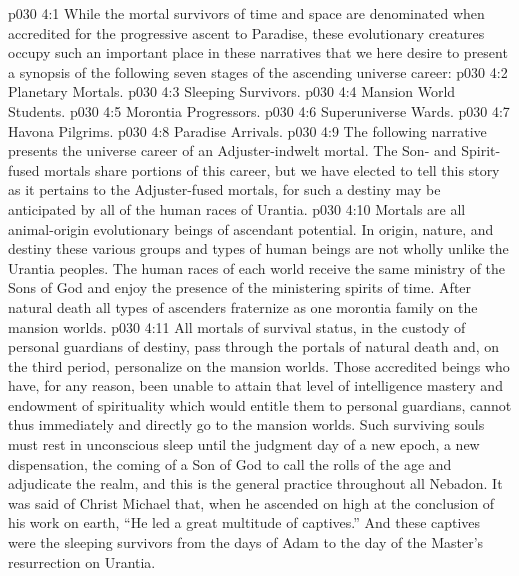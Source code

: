 \vs p030 4:1 While the mortal survivors of time and space are denominated  when accredited for the progressive ascent to Paradise, these evolutionary creatures occupy such an important place in these narratives that we here desire to present a synopsis of the following seven stages of the ascending universe career:
\vs p030 4:2 \bibnobreakspace Planetary Mortals.
\vs p030 4:3 \bibnobreakspace Sleeping Survivors.
\vs p030 4:4 \bibnobreakspace Mansion World Students.
\vs p030 4:5 \bibnobreakspace Morontia Progressors.
\vs p030 4:6 \bibnobreakspace Superuniverse Wards.
\vs p030 4:7 \bibnobreakspace Havona Pilgrims.
\vs p030 4:8 \bibnobreakspace Paradise Arrivals.
\vs p030 4:9 \pc The following narrative presents the universe career of an Adjuster\hyp{}indwelt mortal. The Son\hyp{} and Spirit\hyp{}fused mortals share portions of this career, but we have elected to tell this story as it pertains to the Adjuster\hyp{}fused mortals, for such a destiny may be anticipated by all of the human races of Urantia.
\vs p030 4:10 \bibnobreakspace {} Mortals are all animal\hyp{}origin evolutionary beings of ascendant potential. In origin, nature, and destiny these various groups and types of human beings are not wholly unlike the Urantia peoples. The human races of each world receive the same ministry of the Sons of God and enjoy the presence of the ministering spirits of time. After natural death all types of ascenders fraternize as one morontia family on the mansion worlds.
\vs p030 4:11 \bibnobreakspace {} All mortals of survival status, in the custody of personal guardians of destiny, pass through the portals of natural death and, on the third period, personalize on the mansion worlds. Those accredited beings who have, for any reason, been unable to attain that level of intelligence mastery and endowment of spirituality which would entitle them to personal guardians, cannot thus immediately and directly go to the mansion worlds. Such surviving souls must rest in unconscious sleep until the judgment day of a new epoch, a new dispensation, the coming of a Son of God to call the rolls of the age and adjudicate the realm, and this is the general practice throughout all Nebadon. It was said of Christ Michael that, when he ascended on high at the conclusion of his work on earth, “He led a great multitude of captives.” And these captives were the sleeping survivors from the days of Adam to the day of the Master’s resurrection on Urantia.

